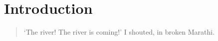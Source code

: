 \chapter{Introduction}

\blockquote{
%
%	
%	
%	
%	
%	
%	
	
	`The river! The river is coming!' I shouted, in broken Marathi.

}
